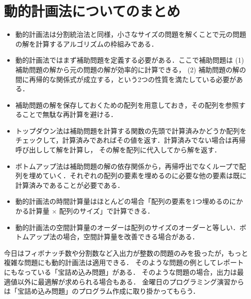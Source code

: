 \documentclass[a4paper,twoside,onecolumn,openany,article]{memoir}
\theoremstyle{remark}
\begin{document}
\section{動的計画法についてのまとめ}
\begin{itemize}
\item 動的計画法は分割統治法と同様，小さなサイズの問題を解くことで元の問題の解を計算するアルゴリズムの枠組みである．
\item 動的計画法ではまず補助問題を定義する必要がある．ここで補助問題は (1) 補助問題の解から元の問題の解が効率的に計算できる，
(2) 補助問題の解の間に再帰的な関係式が成立する，という2つの性質を満たしている必要がある．
\item 補助問題の解を保存しておくための配列を用意しておき，その配列を参照することで無駄な再計算を避ける．
\item トップダウン法は補助問題を計算する関数の先頭で計算済みかどうか配列をチェックして，計算済みであればその値を返す．計算済みでない場合は再帰呼び出しして解を計算し，
その解を配列に代入してから解を返す．
\item ボトムアップ法は補助問題の解の依存関係から，再帰呼出でなくループで配列を埋めていく．それぞれの配列の要素を埋めるのに必要な他の要素は既に計算済みであることが必要である．
\item 動的計画法の時間計算量はほとんどの場合「配列の要素を1つ埋めるのにかかる計算量 $\times$ 配列のサイズ」で計算できる．
\item 動的計画法の空間計算量のオーダーは配列のサイズのオーダーと等しい．ボトムアップ法の場合，空間計算量を改善できる場合がある．
\end{itemize}
今日はフィボナッチ数や分割数など入出力が整数の問題のみを扱ったが，もっと複雑な問題にも動的計画法は適用できる．
そのような問題の例としてレポートにもなっている「宝詰め込み問題」がある．
そのような問題の場合，出力は最適値以外に最適解が求められる場合もある．
金曜日のプログラミング演習からは「宝詰め込み問題」のプログラム作成に取り掛かってもらう．
\end{document}
